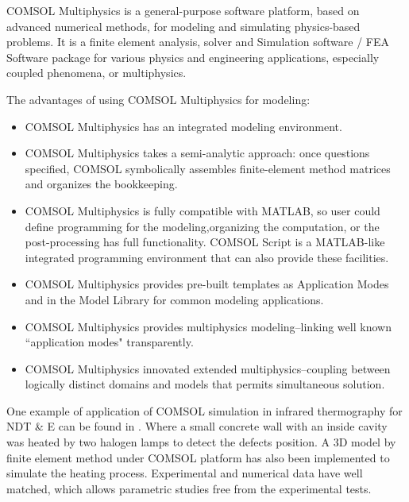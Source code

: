 COMSOL Multiphysics is a general-purpose software platform, based on advanced numerical methods, for modeling and simulating physics-based problems. It is a finite element analysis, solver and Simulation software / FEA Software package for various physics and engineering applications, especially coupled phenomena, or multiphysics.

The advantages of using COMSOL Multiphysics for modeling:
\begin{itemize}
	\item COMSOL Multiphysics has an integrated modeling environment.
	\item COMSOL Multiphysics takes a semi-analytic approach: once questions specified, COMSOL symbolically assembles finite-element method matrices and organizes the bookkeeping.
	\item COMSOL Multiphysics is fully compatible with MATLAB, so user could define programming for the modeling,organizing the computation, or the post-processing has full functionality. COMSOL Script is a MATLAB-like integrated programming environment that can also provide these facilities.
	\item COMSOL Multiphysics provides pre-built templates as Application Modes and in the Model Library for common modeling applications.
	\item COMSOL Multiphysics provides multiphysics modeling--linking well known ``application modes" transparently.
	\item COMSOL Multiphysics innovated extended multiphysics--coupling between logically distinct domains and models that permits simultaneous solution.
\end{itemize}


One example of application of COMSOL simulation in infrared thermography for NDT \& E can be found in \citep{Cannas2012Modeling}. Where a small concrete wall with an inside cavity was heated by two halogen lamps to detect the defects position. A 3D model by finite element method under COMSOL platform has also been implemented to simulate the heating process. Experimental and numerical data have well matched, which allows parametric studies free from the experimental tests.

